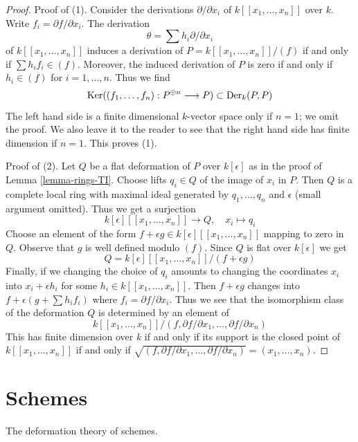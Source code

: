 \begin{proof}
Proof of (1). Consider the derivations $\partial/\partial x_i$ of
$k[[x_1, \ldots, x_n]]$ over $k$. Write $f_i = \partial f/\partial x_i$.
The derivation
$$
\theta = \sum h_i \partial/\partial x_i
$$
of $k[[x_1, \ldots, x_n]]$
induces a derivation of $P = k[[x_1, \ldots, x_n]]/(f)$
if and only if
$\sum h_i f_i \in (f)$. Moreover, the induced derivation of $P$
is zero if and only if $h_i \in (f)$ for $i = 1, \ldots, n$.
Thus we find
$$
\mathop{\mathrm{Ker}}((f_1, \ldots, f_n) : P^{\oplus n} \longrightarrow P) \subset
\text{Der}_k(P, P)
$$
The left hand side is a finite dimensional $k$-vector space only if
$n = 1$; we omit the proof. We also leave it to the reader to see
that the right hand side has finite dimension if $n = 1$.
This proves (1).

\medskip\noindent
Proof of (2). Let $Q$ be a flat deformation of $P$ over $k[\epsilon]$
as in the proof of Lemma \ref{lemma-rings-TI}. Choose lifts $q_i \in Q$
of the image of $x_i$ in $P$. Then $Q$ is a complete local ring
with maximal ideal generated by $q_1, \ldots, q_n$ and $\epsilon$
(small argument omitted). Thus we get a surjection
$$
k[\epsilon][[x_1, \ldots, x_n]] \longrightarrow Q,\quad
x_i \longmapsto q_i
$$
Choose an element of the form
$f + \epsilon g \in k[\epsilon][[x_1, \ldots, x_n]]$
mapping to zero in $Q$. Observe that $g$ is well defined modulo $(f)$.
Since $Q$ is flat over $k[\epsilon]$ we get
$$
Q = k[\epsilon][[x_1, \ldots, x_n]]/(f + \epsilon g)
$$
Finally, if we changing the choice of $q_i$ amounts to
changing the coordinates $x_i$ into $x_i + \epsilon h_i$
for some $h_i \in k[[x_1, \ldots, x_n]]$. Then
$f + \epsilon g$ changes into $f + \epsilon (g + \sum h_i f_i)$
where $f_i = \partial f/\partial x_i$. Thus we see that the
isomorphism class of the deformation $Q$ is determined
by an element of
$$
k[[x_1, \ldots, x_n]]/
(f, \partial f/\partial x_1, \ldots,  \partial f/\partial x_n)
$$
This has finite dimension over $k$ if and only if
its support is the closed point of $k[[x_1, \ldots, x_n]]$
if and only if
$\sqrt{(f, \partial f/\partial x_1, \ldots,  \partial f/\partial x_n)} =
(x_1, \ldots, x_n)$.
\end{proof}






\section{Schemes}
\label{section-schemes}

\noindent
The deformation theory of schemes.

